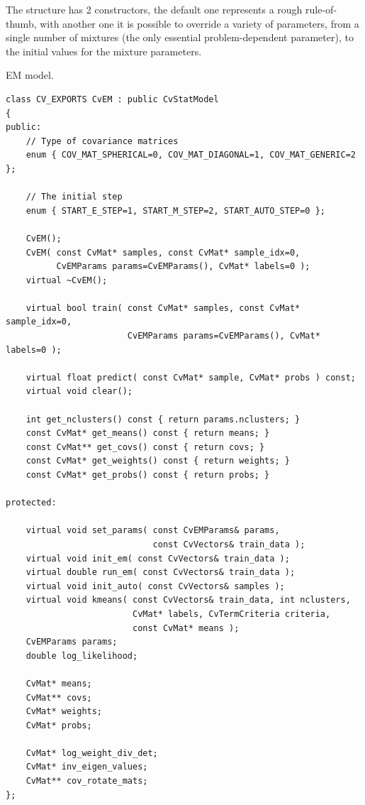 
The structure has 2 constructors, the default one represents a rough rule-of-thumb, with another one it is possible to override a variety of parameters, from a single number of mixtures (the only essential problem-dependent parameter), to the initial values for the mixture parameters.


EM model.

\begin{lstlisting}
class CV_EXPORTS CvEM : public CvStatModel
{
public:
    // Type of covariance matrices
    enum { COV_MAT_SPHERICAL=0, COV_MAT_DIAGONAL=1, COV_MAT_GENERIC=2 };

    // The initial step
    enum { START_E_STEP=1, START_M_STEP=2, START_AUTO_STEP=0 };

    CvEM();
    CvEM( const CvMat* samples, const CvMat* sample_idx=0,
          CvEMParams params=CvEMParams(), CvMat* labels=0 );
    virtual ~CvEM();

    virtual bool train( const CvMat* samples, const CvMat* sample_idx=0,
                        CvEMParams params=CvEMParams(), CvMat* labels=0 );

    virtual float predict( const CvMat* sample, CvMat* probs ) const;
    virtual void clear();

    int get_nclusters() const { return params.nclusters; }
    const CvMat* get_means() const { return means; }
    const CvMat** get_covs() const { return covs; }
    const CvMat* get_weights() const { return weights; }
    const CvMat* get_probs() const { return probs; }

protected:

    virtual void set_params( const CvEMParams& params,
                             const CvVectors& train_data );
    virtual void init_em( const CvVectors& train_data );
    virtual double run_em( const CvVectors& train_data );
    virtual void init_auto( const CvVectors& samples );
    virtual void kmeans( const CvVectors& train_data, int nclusters,
                         CvMat* labels, CvTermCriteria criteria,
                         const CvMat* means );
    CvEMParams params;
    double log_likelihood;

    CvMat* means;
    CvMat** covs;
    CvMat* weights;
    CvMat* probs;

    CvMat* log_weight_div_det;
    CvMat* inv_eigen_values;
    CvMat** cov_rotate_mats;
};
\end{lstlisting}


